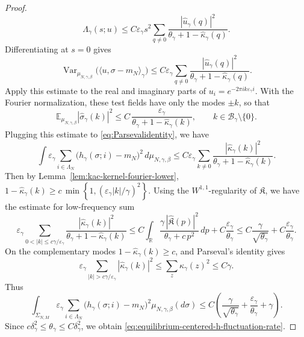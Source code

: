 \documentclass{article}
\begin{document}
\begin{proof}
\[
\Lambda_\gamma(s;u)
\le
C\varepsilon_\gamma s^2
\sum_{q\ne0}
\frac{|\widehat u_\gamma(q)|^2}
{\theta_\gamma+1-\widehat\kappa_\gamma(q)} .
\]
Differentiating at \(s=0\) gives
\[
\operatorname{Var}_{\mu_{N,\gamma,\beta}}
\bigl(\langle u,\sigma-m_N\rangle_\gamma\bigr)
\le
C\varepsilon_\gamma
\sum_{q\ne0}
\frac{|\widehat u_\gamma(q)|^2}
{\theta_\gamma+1-\widehat\kappa_\gamma(q)} .
\]
Apply this estimate to the real and imaginary parts of
\(u_i=e^{-2\pi i k\varepsilon_\gamma i}\).  With the Fourier normalization,
these test fields have only the modes \(\pm k\), so that
\begin{equation}\label{eq:static-infrared-bound}
    \mathbb E_{\mu_{N,\gamma,\beta}}
\left|\widehat\sigma_\gamma(k)\right|^2
\le C\,\frac{\varepsilon_\gamma}
{\theta_\gamma+1-\widehat\kappa_\gamma(k)},
\qquad k\in\mathcal B_\gamma\setminus\{0\}.
\end{equation}
Plugging this estimate to \eqref{eq:Parsevalidentity}, we have
\[
\int \varepsilon_\gamma
\sum_{i\in\Lambda_N}
\bigl(h_\gamma(\sigma;i)-m_N\bigr)^2\,d\mu_{N,\gamma,\beta}
\le
C\varepsilon_\gamma
\sum_{k\ne0}
\frac{|\widehat\kappa_\gamma(k)|^2}
{\theta_\gamma+1-\widehat\kappa_\gamma(k)}.
\]
Then by Lemma~\ref{lem:kac-kernel-fourier-lower},
\(
1-\widehat\kappa_\gamma(k)
\ge
c\,\min\left\{1,
\left(\varepsilon_\gamma |k|/\gamma\right)^2
\right\}.
\)
Using the \(W^{1,1}\)-regularity of \(\mathfrak K\), we have the estimate for low-frequency sum 
\[
\varepsilon_\gamma
\sum_{0<|k|\le c\gamma/\varepsilon_\gamma}
\frac{|\widehat\kappa_\gamma(k)|^2}
{\theta_\gamma+1-\widehat\kappa_\gamma(k)}
\le
C
\int_{\mathbb R}
\frac{\gamma\,|\widehat{\mathfrak K}(p)|^2}
{\theta_\gamma+c\,p^2}\,dp +C\frac{\varepsilon_\gamma}{\theta_\gamma} \le C \frac{\gamma}{\sqrt{\theta_\gamma}} + C\frac{\varepsilon_\gamma}{\theta_\gamma}. 
\]
On the complementary modes \(1-\widehat\kappa_\gamma(k)\ge c\), and Parseval's identity gives
\begin{equation}\label{eq:highkerfre}
    \varepsilon_\gamma
\sum_{|k|>c\gamma/\varepsilon_\gamma}
|\widehat\kappa_\gamma(k)|^2
\le \sum_z\kappa_\gamma(z)^2
\le C\gamma .
\end{equation}
Thus
\[
\int_{\Sigma_{N,M}} \varepsilon_\gamma \sum_{i\in\Lambda_N}
\bigl(h_\gamma(\sigma;i)-m_N\bigr)^2
\mu_{N,\gamma,\beta}(d\sigma) \le C\left( \frac{\gamma}{\sqrt{\theta_\gamma}} +\frac{\varepsilon_\gamma}{\theta_\gamma} +\gamma \right).
\]
Since $c\delta_\gamma^2
\le
\theta_\gamma \le
C\delta_\gamma^2$, we obtain \eqref{eq:equilibrium-centered-h-fluctuation-rate}.
\end{proof}
\end{document}
